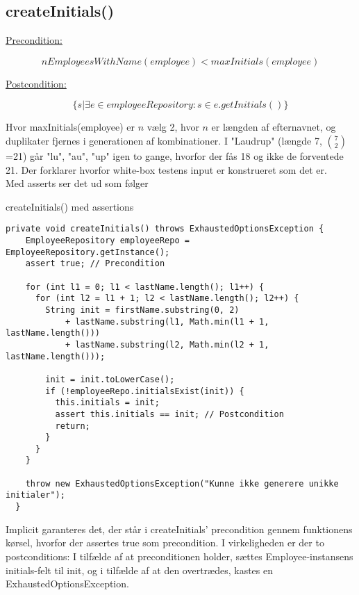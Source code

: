 \subsection{createInitials()} \label{sec:contract_create_initials}
\underline{Precondition:}
\vspace{4pt}

\begin{equation}
    nEmployeesWithName(employee) < maxInitials(employee)
\end{equation}
\vspace{4pt}

\noindent
\underline{Postcondition:}
\vspace{4pt}

\begin{equation}
    \{s | \exists e \in employeeRepository : s \in e.getInitials()\}
\end{equation}
\vspace{4pt}

\noindent
Hvor maxInitials(employee) er $n$ vælg 2, hvor $n$ er længden af efternavnet, og duplikater fjernes i generationen af kombinationer.
I "Laudrup" (længde 7, $7 \choose 2$=21) går "lu", "au", "up" igen to gange, hvorfor der fås 18 og ikke de forventede 21. Der forklarer hvorfor white-box testens input er konstrueret som det er.\\[4mm]
Med asserts ser det ud som følger

\begin{listing}[H]
    \centering
    \caption{createInitials() med assertions}\label{lst:create_initials_assertions}
    \begin{verbatim}
private void createInitials() throws ExhaustedOptionsException {
    EmployeeRepository employeeRepo = EmployeeRepository.getInstance();
    assert true; // Precondition

    for (int l1 = 0; l1 < lastName.length(); l1++) {
      for (int l2 = l1 + 1; l2 < lastName.length(); l2++) {
        String init = firstName.substring(0, 2)
            + lastName.substring(l1, Math.min(l1 + 1, lastName.length()))
            + lastName.substring(l2, Math.min(l2 + 1, lastName.length()));

        init = init.toLowerCase();
        if (!employeeRepo.initialsExist(init)) {
          this.initials = init;
          assert this.initials == init; // Postcondition
          return;
        }
      }
    }

    throw new ExhaustedOptionsException("Kunne ikke generere unikke initialer");
  }
    \end{verbatim}
\end{listing}
\noindent
Implicit garanteres det, der står i createInitials' precondition gennem funktionens kørsel, hvorfor der assertes true som precondition. I virkeligheden er der to postconditions: I tilfælde af at preconditionen holder, sættes Employee-instansens initials-felt til init, og i tilfælde af at den overtrædes, kastes en ExhaustedOptionsException.\\[4mm]

